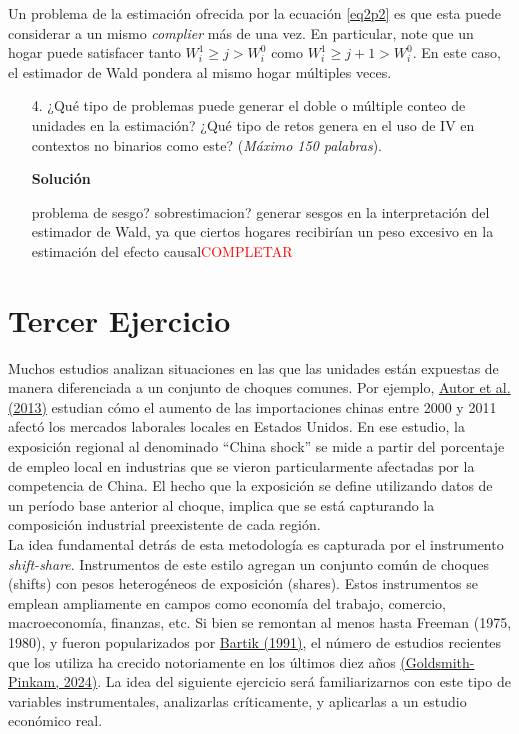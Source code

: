 \documentclass[a4paper, answers, addpoints, 11pt]{exam}
\newenvironment{solucion}{%
  \begin{mdframed}[
    backgroundcolor=blue!5,    %
    linecolor=blue!50,          %
    linewidth=2pt,              %
    leftmargin=10pt,            %
    rightmargin=8pt,           %
    topline=true,              %
    bottomline=true,            %
    roundcorner=10pt,           %
    innerleftmargin=10pt,       %
    innerrightmargin=10pt,      %
    innerbottommargin=10pt,     %
    innertopmargin=10pt         %
  ]%
  \begin{tcolorbox}[colframe=blue!50!black, colback=blue!50, coltitle=white, sharp corners=all, boxrule=1mm, width=\textwidth, halign=left, valign=center, top=0mm, bottom=0mm, left=0mm, right=0mm] \textbf{Solución} \end{tcolorbox} }{\end{mdframed}}
\begin{document}
    Un problema de la estimación ofrecida por la ecuación \ref{eq2p2} es que esta puede considerar a un mismo \textit{complier} más de una vez. En particular, note que un hogar puede satisfacer tanto $W_i^1 \geq j > W_i^0$ como $W_i^1 \geq j + 1 > W_i^0$. En este caso, el estimador de Wald pondera al mismo hogar múltiples veces.
    
    \begin{enumerate}
        \item[4.] ¿Qué tipo de problemas puede generar el doble o múltiple conteo de unidades en la estimación? ¿Qué tipo de retos genera en el uso de IV en contextos no binarios como este? (\textit{Máximo 150 palabras}).
        
        
\begin{solucion}
problema de sesgo? sobrestimacion? generar sesgos en la interpretación del estimador de Wald, ya que ciertos hogares recibirían un peso excesivo en la estimación del efecto causal\textcolor{red}{COMPLETAR}
\end{solucion}
        
    \end{enumerate}

    \newpage

\section*{Tercer Ejercicio}


Muchos estudios analizan situaciones en las que las unidades están expuestas de manera diferenciada a un conjunto de choques comunes. Por ejemplo, \href{https://www.aeaweb.org/articles?id=10.1257/aer.103.6.2121}{Autor et al. (2013)} estudian cómo el aumento de las importaciones chinas entre 2000 y 2011 afectó los mercados laborales locales en Estados Unidos. En ese estudio, la exposición regional al denominado “China shock” se mide a partir del porcentaje de empleo local en industrias que se vieron particularmente afectadas por la competencia de China. El hecho que la exposición se define utilizando datos de un período base anterior al choque, implica que se está capturando la composición industrial preexistente de cada región. \\

La idea fundamental detrás de esta metodología es capturada por el instrumento \textit{shift-share}. Instrumentos de este estilo agregan un conjunto común de choques (shifts) con pesos heterogéneos de exposición (shares). Estos instrumentos se emplean ampliamente en campos como economía del trabajo, comercio, macroeconomía, finanzas, etc. Si bien se remontan al menos hasta Freeman (1975, 1980), y fueron popularizados por \href{https://ideas.repec.org/b/upj/ubooks/wbsle.html}{Bartik (1991)}, el número de estudios recientes que los utiliza ha crecido notoriamente en los últimos diez años \href{https://arxiv.org/abs/2405.20604}{(Goldsmith-Pinkam, 2024)}. La idea del siguiente ejercicio será familiarizarnos con este tipo de variables instrumentales, analizarlas críticamente, y aplicarlas a un estudio económico real. \\
\end{document}
